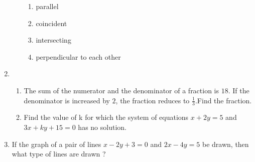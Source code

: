 \begin{enumerate}
\begin{enumerate}[label=(\roman*)]
\begin{enumerate}[label=(\Alph*)]
             \item parallel
             \item coincident
             \item intersecting
             \item perpendicular to each other
\end{enumerate}
\end{enumerate}
\item
\begin{enumerate}
\item The sum of the numerator and the denominator of a fraction is $18$. If the denominator is increased by $2$, the fraction reduces to $\frac{1}{3}$.Find the fraction.
\item Find the value of k for which the system of equations $x+2y=5$ and $3x+ky+15=0$ has no solution.
\end{enumerate}
\item If the graph of a pair of lines $x-2y+3=0$ and $2x-4y=5$ be drawn, then what type of lines are drawn ?
\end{enumerate}
